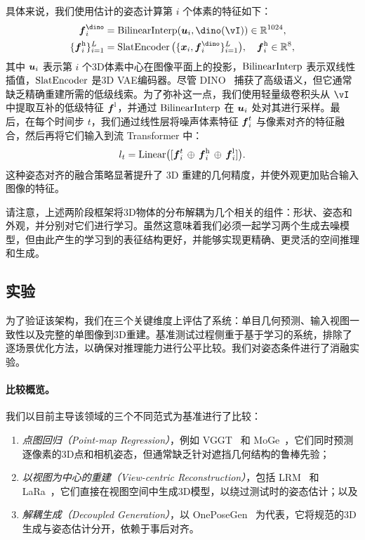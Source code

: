 \documentclass[../../book-main_zh.tex]{subfiles}
\begin{document}
具体来说，我们使用估计的姿态计算第 $i$ 个体素的特征如下：
\begin{equation}
\begin{aligned}
\feat^\dino_{i} &= \interp(\pixcoord_i, \dino(\image)) \in \mathbb{R}^{1024}, \\
\{\feat^{\high}_{i}\}_{i=1}^{\numpts} &= \slatenc\big(\{\point_i, \feat^\dino_i\}_{i=1}^{\numpts}\big), \quad \feat^{\high}_{i} \in \mathbb{R}^{8},
\end{aligned}
\label{eq:latent}
\end{equation}
其中 $\boldsymbol{u}_i$ 表示第 $i$ 个3D体素中心在图像平面上的投影，$\operatorname{BilinearInterp}$ 表示双线性插值，$\operatorname{SlatEncoder}$ 是3D VAE编码器。尽管 DINO~\citep{oquab2023dinov2} 捕获了高级语义，但它通常缺乏精确重建所需的低级线索。为了弥补这一点，我们使用轻量级卷积头从 $\image$ 中提取互补的低级特征 $\boldsymbol{f}^{\mathrm{l}}$，并通过 $\operatorname{BilinearInterp}$ 在 $\boldsymbol{u}_i$ 处对其进行采样。最后，在每个时间步 $t$，我们通过线性层将噪声体素特征 $\boldsymbol{f}_i^{t}$ 与像素对齐的特征融合，然后再将它们输入到流 Transformer 中：
\begin{equation}
l_t = \mathrm{Linear}\big([\boldsymbol{f}_i^{t}\,\oplus\, \boldsymbol{f}^{\mathrm{h}}_{i} \,\oplus\, \boldsymbol{f}^{\mathrm{l}}_{i}]\big).
\end{equation}
这种姿态对齐的融合策略显著提升了 3D 重建的几何精度，并使外观更加贴合输入图像的特征。

\begin{remark}[解耦的生成过程]
请注意，上述两阶段框架将3D物体的分布解耦为几个相关的组件：形状、姿态和外观，并分别对它们进行学习。虽然这意味着我们必须一起学习两个生成去噪模型，但由此产生的学习到的表征结构更好，并能够实现更精确、更灵活的空间推理和生成。
\end{remark}

\subsection{实验}
\label{sec:experiments}
\label{sec:Evaluation}

为了验证该架构，我们在三个关键维度上评估了系统：单目几何预测、输入视图一致性以及完整的单图像到3D重建。基准测试过程侧重于基于学习的系统，排除了逐场景优化方法，以确保对推理能力进行公平比较。我们对姿态条件进行了消融实验。

\paragraph{比较概览。}
我们以目前主导该领域的三个不同范式为基准进行了比较：
\begin{enumerate}[label=(\roman*)]
    \item \textit{点图回归（Point-map Regression）}，例如 VGGT~\citep{wang2025vggt} 和 MoGe~\citep{wang2025moge}，它们同时预测逐像素的3D点和相机姿态，但通常缺乏针对遮挡几何结构的鲁棒先验；
    \item \textit{以视图为中心的重建（View-centric Reconstruction）}，包括 LRM~\citep{hong2023lrm} 和 LaRa~\citep{LaRa}，它们直接在视图空间中生成3D模型，以绕过测试时的姿态估计；以及
    \item \textit{解耦生成（Decoupled Generation）}，以 OnePoseGen~\citep{geng2025one} 为代表，它将规范的3D生成与姿态估计分开，依赖于事后对齐。
\end{enumerate}
\end{document}
